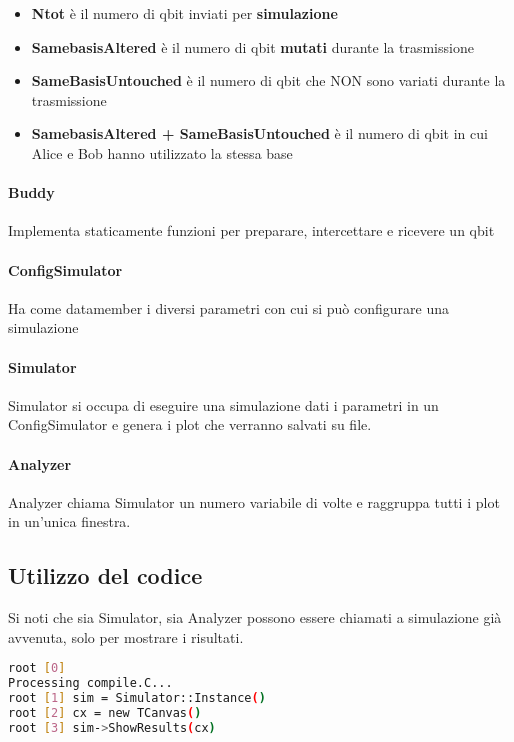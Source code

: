 \documentclass[11 pt, a4paper]{article}
\begin{document}
\begin{itemize}
\item \textbf{Ntot} è il numero di qbit inviati per \textbf{simulazione}
\item \textbf{SamebasisAltered} è il numero di qbit \textbf{mutati} durante la trasmissione
\item \textbf{SameBasisUntouched} è il numero di qbit che NON sono variati durante la trasmissione
\item \textbf{SamebasisAltered + SameBasisUntouched} è il numero di qbit in cui Alice e Bob hanno utilizzato la stessa base
\end{itemize}

\paragraph{Buddy}
Implementa staticamente funzioni per preparare, intercettare e ricevere un qbit

\paragraph{ConfigSimulator}
Ha come datamember i diversi parametri con cui si può configurare una simulazione

\paragraph{Simulator}
Simulator si occupa di eseguire una simulazione dati i parametri in un ConfigSimulator e genera i plot che verranno salvati su file.

\paragraph{Analyzer}
Analyzer chiama Simulator un numero variabile di volte e raggruppa tutti i plot in un'unica finestra.

\subsection{Utilizzo del codice}
Si noti che sia Simulator, sia Analyzer possono essere chiamati a simulazione già avvenuta, solo per mostrare i risultati.

\begin{lstlisting}[language=bash, style=myRoot]
root [0] 
Processing compile.C...
root [1] sim = Simulator::Instance()
root [2] cx = new TCanvas()
root [3] sim->ShowResults(cx)
\end{lstlisting}
\end{document}

